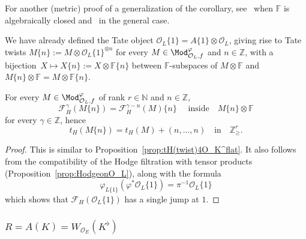 \begin{rema}
For another (metric) proof of a generalization of the corollary, see~\cite[Th\'eor\`eme~7]{CoNi16} when $\mathbb{F}$ is algebraically closed and~\cite[\S 3.2]{Co15} in the general case.
\end{rema}

We have already defined the Tate object $\mathcal{O}_{L}\{1\}=A\{1\}\otimes\mathcal{O}_{L}$, giving rise to Tate twists $M\{n\}:=M\otimes\mathcal{O}_{L}\{1\}^{\otimes n}$ for every $M\in\Mod_{\mathcal{O}_{L},f}^{\varphi}$ and $n\in\mathbb{Z}$, with a bijection~$X\mapsto X\{n\}:=X\otimes\mathbb{F}\{n\}$ between $\mathbb{F}$-subspaces of $M\otimes\mathbb{F}$ and $M\{n\}\otimes\mathbb{F}=M\otimes\mathbb{F}\{n\}$.

\begin{prop}\label{prop:tH(twist)4O_L}
For every $M\in\Mod_{\mathcal{O}_{L},f}^{\varphi}$ of rank $r\in\mathbb{N}$ and $n\in\mathbb{Z}$,
\[
\mathcal{F}_{H}^{\gamma}(M\{n\})=\mathcal{F}_{H}^{\gamma-n}(M)\{n\}\quad\text{ inside}\quad M\{n\}\otimes\mathbb{F}
\]
for every $\gamma\in\mathbb{Z}$, hence
\[
t_{H}(M\{n\})=t_{H}(M)+(n,\dots,n)\quad\text{in}\quad\mathbb{Z}_{\geq}^{r}.
\]
\end{prop}

\begin{proof}
This is similar to Proposition~\ref{prop:tH(twist)4O_K^flat}. It also follows from the compatibility of the Hodge filtration with tensor products (Proposition~\ref{prop:HodgeonO_L}), along with the formula
\[
\varphi_{L\{1\}}(\varphi^{\ast}\mathcal{O}_{L}\{1\})=\pi^{-1}\mathcal{O}_{L}\{1\}
\]
which shows that $\mathcal{F}_{H}(\mathcal{O}_{L}\{1\})$ has a single jump at $1$.
\end{proof}

\subsubsection{\texorpdfstring{${R=A(K)=W_{\mathcal{O}_{E}}(K^{\flat})}$}{R=A(K)=WOE(K flat)}}\label{subsec:RisW(Kflat)}

